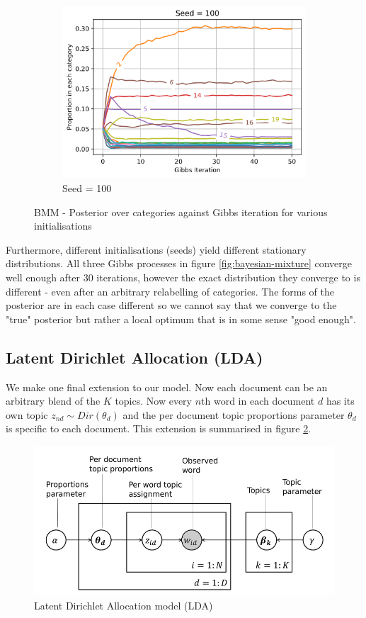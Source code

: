 \documentclass[]{article}
\newcommand{\figwidth}{0.6\linewidth}
\begin{document}
\begin{figure}[!h]
\begin{subfigure}{0.33\linewidth}
		\includegraphics[width=\linewidth]{gibbs-posterior-3.png}
		\caption{Seed = 100}	
	\end{subfigure}
	\caption{BMM - Posterior over categories against Gibbs iteration for various initialisations}
	\label{fig:gibbs-posterior}
\end{figure}

Furthermore, different initialisations (seeds) yield different stationary distributions. All three Gibbs processes in figure \ref{fig:bayesian-mixture} converge well enough after 30 iterations, however the exact distribution they converge to is different - even after an arbitrary relabelling of categories. The forms of the posterior are in each case different so we cannot say that we converge to the "true" posterior but rather a local optimum that is in some sense "good enough".

\subsection{Latent Dirichlet Allocation (LDA)}

We make one final extension to our model. Now each document can be an arbitrary blend of the $K$ topics. Now every $n$th word in each document $d$ has its own topic $z_{nd} \sim Dir(\theta_d)$ and the per document topic proportions parameter $\theta_d$ is specific to each document. This extension is summarised in figure \ref{fig:lda-model}.
%
\begin{figure}[!h]
	\centering
	\includegraphics[width=\figwidth]{lda.png}
	\caption{Latent Dirichlet Allocation model (LDA)}
	\label{fig:lda-model}
\end{figure}
\end{document}
